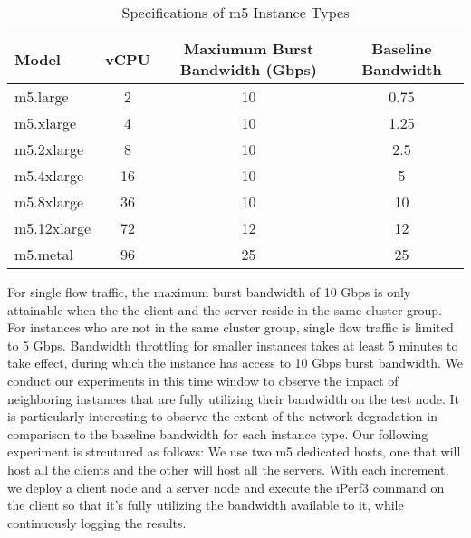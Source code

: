 \begin{table}[H]
\centering
\begin{tabular}{lccc}
\toprule
\textbf{Model} & \textbf{vCPU} & \textbf{Maxiumum Burst Bandwidth (Gbps)} & \textbf{Baseline Bandwidth} \\
\midrule
m5.large     & 2  & 10 & 0.75\\
m5.xlarge    & 4  & 10 & 1.25\\
m5.2xlarge   & 8  & 10 & 2.5\\
m5.4xlarge   & 16 & 10 & 5\\
m5.8xlarge   & 36 & 10 & 10\\
m5.12xlarge  & 72 & 12 & 12\\
m5.metal     & 96 & 25 & 25\\
\bottomrule
\end{tabular}
\caption{Specifications of m5 Instance Types}
\end{table}
\noindent
For single flow traffic, the maximum burst bandwidth of 10 Gbps is only attainable when the the client and 
the server reside in the same cluster group. For instances who are not in the same cluster group, single flow 
traffic is limited to 5 Gbps. 
Bandwidth throttling for smaller instances takes at least 5 minutes to take effect, during which the instance
has access to 10 Gbps burst bandwidth. We conduct our experiments in this time window to observe the impact 
of neighboring instances that are fully utilizing their bandwidth on the test node. It is particularly 
interesting to observe the extent of the network degradation in comparison to the baseline bandwidth 
for each instance type. Our following experiment is strcutured as follows: We use two m5 dedicated hosts, one 
that will host all the clients and the other will host all the servers. With each increment, we deploy a client 
node and a server node and execute the iPerf3 command on the client so that it's fully utilizing the 
bandwidth available to it, while continuously logging the results.  

